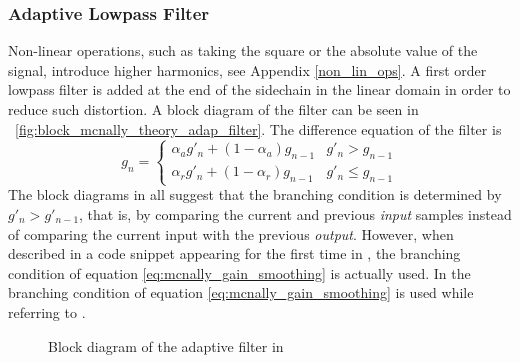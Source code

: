 \documentclass[../main2.tex]{subfiles}
\providecommand{\rootdir}{..}
\begin{document}
\subsubsection{Adaptive Lowpass Filter}
Non-linear operations, such as taking the square or the absolute value of the signal, introduce higher harmonics, see Appendix \ref{non_lin_ops}. A first order lowpass filter is added at the end of the sidechain in the linear domain in order to reduce such distortion. A block diagram of the filter can be seen in ~\ref{fig:block_mcnally_theory_adap_filter}. The difference equation of the filter is
\begin{equation}
g_n = \begin{cases}
    \alpha_{a} g'_n + (1-\alpha_{a}) g_{n-1} 	& g'_n > g_{n-1} \\
    \alpha_{r} g'_n + (1-\alpha_{r}) g_{n-1} 	& g'_n \leq g_{n-1}
\end{cases}
\label{eq:mcnally_gain_smoothing}
\end{equation}
The block diagrams in \cite{mcnally1984dynamic}\cite{dafx02}\cite{dagx11}\cite{zolzer1997digital}\cite{zolzer1997digital}\cite{zolzer2008digital} all suggest that the branching condition is determined by $g'_n > g'_{n-1}$, that is, by comparing the current and previous \emph{input} samples instead of comparing the current input with the previous \emph{output}. However, when described in a code snippet appearing for the first time in \cite{dafx11}, the branching condition of equation \eqref{eq:mcnally_gain_smoothing} is actually used. In \cite{bitzer2006parameter} the branching condition of equation \eqref{eq:mcnally_gain_smoothing} is used while referring to \cite{mcnally1984dynamic}\cite{dafx02}.
\begin{figure}
\centerline{}
\caption{Block diagram of the adaptive filter in \cite{mcnally1984dynamic}}
\label{fig:block_mcnally_theory_rms}
\end{figure}
\end{document}
